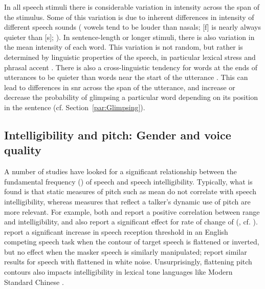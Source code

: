 In all speech stimuli there is considerable variation in intensity across the span of the stimulus.  Some of this variation is due to inherent differences in intensity of different speech sounds (\eg{} vowels tend to be louder than nasals; [f] is nearly always quieter than [s]; \citealt{sowl}).  In sentence-length or longer stimuli, there is also variation in the mean intensity of each word.  This variation is not random, but rather is determined by linguistic properties of the speech, in particular lexical stress and phrasal accent \citep{Fry1955, SluijterVanHeuven1996, PlagEtAl2011}.  There is also a cross-linguistic tendency for words at the ends of utterances to be quieter than words near the start of the utterance \citep{Ladefoged1967, StrikBoves1995, TrouvainEtAl1998}.  This can lead to differences in \ac{snr} across the span of the utterance, and increase or decrease the probability of glimpsing a particular word depending on its position in the sentence (cf. Section~\ref{par:Glimpsing}).  


\subsection[Intelligibility and pitch]{Intelligibility and pitch: Gender and voice quality}
A number of studies have looked for a significant relationship between the fundamental frequency (\fo) of speech and speech intelligibility.  Typically, what is found is that static measures of pitch such as mean \fo{} do not correlate with speech intelligibility, whereas measures that reflect a talker’s dynamic use of pitch are more relevant.  For example, both \citet{BradlowEtAl1996} and \citet{McCloyEtAl2013} report a positive correlation between \fo{} range and intelligibility, and \citet{McCloyEtAl2013} also report a significant effect for rate of change of \fo{} (, cf. \citealt{GauthierEtAl2007b, GauthierEtAl2007a, GauthierEtAl2009}).  \citet{BinnsCulling2007} report a significant increase in speech reception threshold in an English competing speech task when the \fo{} contour of target speech is flattened or inverted, but no effect when the masker speech is similarly manipulated; \citet{WatsonSchlauch2008} report similar results for speech with flattened \fo{} in white noise.  Unsurprisingly, flattening pitch contours also impacts intelligibility in lexical tone languages like Modern Standard Chinese \citep{PatelEtAl2010}.

